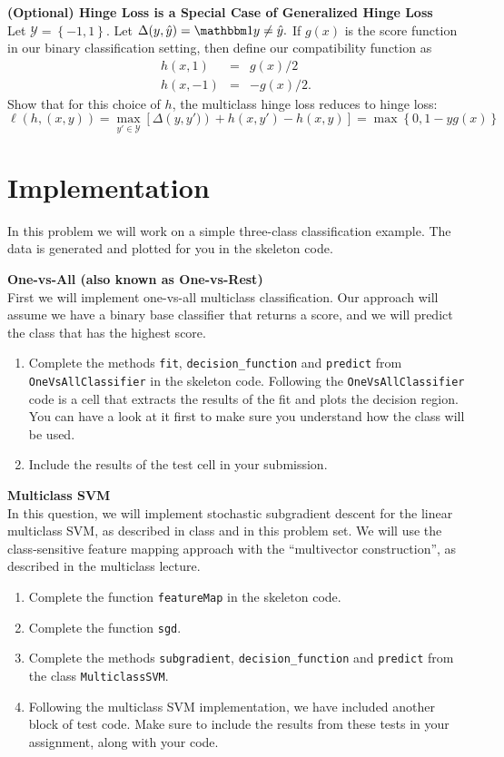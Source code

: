 \documentclass{article}
\newcommand{\nyuparagraph}[1]{\vspace{0.3cm}\textcolor{nyupurple}{\bf \large #1}\\}
\theoremstyle{plain}
\theoremstyle{definition}
\begin{document}
\nyuparagraph{(Optional) Hinge Loss is a Special Case of Generalized Hinge
Loss}

Let $\mathcal{Y}=\left\{ -1,1\right\} $. Let $\Delta(y,\hat{y})=\ind{y\neq\hat{y}}.$
If $g(x)$ is the score function in our binary classification setting,
then define our compatibility function as 
\begin{eqnarray*}
h(x,1) & = & g(x)/2\\
h(x,-1) & = & -g(x)/2.
\end{eqnarray*}
Show that for this choice of $h$, the multiclass hinge loss reduces
to hinge loss: 
\[
\ell\left(h,\left(x,y\right)\right)=\max_{y'\in\mathcal{Y}}\left[\Delta\left(y,y')\right)+h(x,y')-h(x,y)\right]=\max\left\{ 0,1-yg(x)\right\} 
\]


\section{Implementation}

In this problem we will work on a simple three-class classification
example.
The data is generated and plotted for you in the skeleton code. 

\nyuparagraph{One-vs-All (also known as One-vs-Rest)}

First we will implement one-vs-all multiclass classification.
Our approach will assume we have a binary base classifier that returns
a score, and we will predict the class that has the highest score. 
\begin{enumerate}
  \setcounter{enumi}{\value{saveenum}}
\item Complete the methods \texttt{fit}, \texttt{decision\_function} and \texttt{predict} from \texttt{OneVsAllClassifier}  in the skeleton code. Following
the \texttt{OneVsAllClassifier} code is a cell that extracts the results of
the fit and plots the decision region. You can have a look at it first to make sure you understand how the class will be used.
\item  Include the results of the test cell in your submission.
\setcounter{saveenum}{\value{enumi}}
\end{enumerate}


\nyuparagraph{Multiclass SVM}

In this question, we will implement stochastic subgradient descent
for the linear multiclass SVM, as described in class and in this
problem set. We will use the class-sensitive feature mapping approach
with the ``multivector construction'', as described in the multiclass lecture.
\begin{enumerate}
  \setcounter{enumi}{\value{saveenum}}
\item Complete the function \texttt{featureMap} in the skeleton code.
\item Complete the function \texttt{sgd}.
\item Complete the methods \texttt{subgradient}, \texttt{decision\_function} and \texttt{predict} from the class \texttt{MulticlassSVM}. 
\item Following the multiclass
SVM implementation, we have included another block of test code. Make
sure to include the results from these tests in your assignment, along
with your code. 
\setcounter{saveenum}{\value{enumi}}
\end{enumerate}
\end{document}
